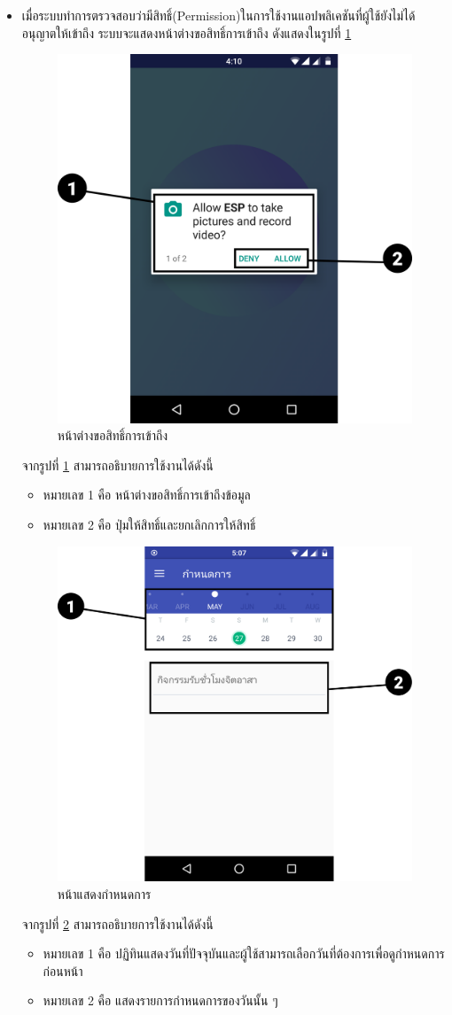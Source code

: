 \begin{enumerate}
\begin{itemize}
		\item เมื่อระบบทำการตรวจสอบว่ามีสิทธิ์(Permission)ในการใช้งานแอปพลิเคชันที่ผู้ใช้ยังไม่ได้อนุญาตให้เข้าถึง ระบบจะแสดงหน้าต่างขอสิทธิ์การเข้าถึง ดังแสดงในรูปที่ \ref{Fig:permission}
		\begin{figure}[H]
			\centering
			\includegraphics[width=0.5\columnwidth]{Figures/7/Manual/permission}
			\caption{หน้าต่างขอสิทธิ์การเข้าถึง}
			\label{Fig:permission}
		\end{figure}
		จากรูปที่ \ref{Fig:permission} สามารถอธิบายการใช้งานได้ดังนี้
		\begin{itemize}[label={--}]
			\item หมายเลข 1 คือ หน้าต่างขอสิทธิ์การเข้าถึงข้อมูล
			\item หมายเลข 2 คือ ปุ่มให้สิทธิ์และยกเลิกการให้สิทธิ์
		\end{itemize}
	
			\begin{figure}[H]
				\centering
				\includegraphics[width=0.5\columnwidth]{Figures/7/Manual/event}
				\caption{หน้าแสดงกำหนดการ}
				\label{Fig:event}
			\end{figure}
			จากรูปที่ \ref{Fig:event} สามารถอธิบายการใช้งานได้ดังนี้
			\begin{itemize}[label={--}]
				\item หมายเลข 1 คือ ปฏิทินแสดงวันที่ปัจจุบันและผู้ใช้สามารถเลือกวันที่ต้องการเพื่อดูกำหนดการก่อนหน้า
				\item หมายเลข 2 คือ แสดงรายการกำหนดการของวันนั้น ๆ
			\end{itemize}
				

\end{itemize}
\end{enumerate}
